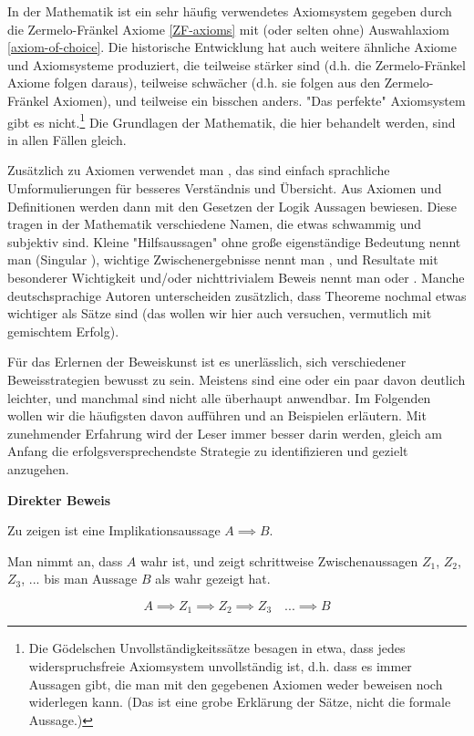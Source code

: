 In der Mathematik ist ein sehr häufig verwendetes Axiomsystem gegeben durch die Zermelo-Fränkel Axiome \ref{ZF-axioms} mit (oder selten ohne) Auswahlaxiom \ref{axiom-of-choice}. Die historische Entwicklung hat auch weitere ähnliche Axiome und Axiomsysteme produziert, die teilweise stärker sind (d.h. die Zermelo-Fränkel Axiome folgen daraus), teilweise schwächer (d.h. sie folgen aus den Zermelo-Fränkel Axiomen), und teilweise ein bisschen anders. "Das perfekte" Axiomsystem gibt es nicht.\footnote{Die Gödelschen Unvollständigkeitssätze besagen in etwa, dass jedes widerspruchsfreie Axiomsystem unvollständig ist, d.h. dass es immer Aussagen gibt, die man mit den gegebenen Axiomen weder beweisen noch widerlegen kann. (Das ist eine grobe Erklärung der Sätze, nicht die formale Aussage.)} Die Grundlagen der Mathematik, die hier behandelt werden, sind in allen Fällen gleich.

Zusätzlich zu Axiomen verwendet man , das sind einfach sprachliche Umformulierungen für besseres Verständnis und Übersicht. Aus Axiomen und Definitionen werden dann mit den Gesetzen der Logik Aussagen bewiesen. Diese tragen in der Mathematik verschiedene Namen, die etwas schwammig und subjektiv sind. Kleine "Hilfsaussagen" ohne große eigenständige Bedeutung nennt man  (Singular ), wichtige Zwischenergebnisse nennt man , und Resultate mit besonderer Wichtigkeit und/oder nichttrivialem Beweis nennt man  oder . Manche deutschsprachige Autoren unterscheiden zusätzlich, dass Theoreme nochmal etwas wichtiger als Sätze sind (das wollen wir hier auch versuchen, vermutlich mit gemischtem Erfolg).

Für das Erlernen der Beweiskunst ist es unerlässlich, sich verschiedener Beweisstrategien bewusst zu sein. Meistens sind eine oder ein paar davon deutlich leichter, und manchmal sind nicht alle überhaupt anwendbar. Im Folgenden wollen wir die häufigsten davon aufführen und an Beispielen erläutern. Mit zunehmender Erfahrung wird der Leser immer besser darin werden, gleich am Anfang die erfolgsversprechendste Strategie zu identifizieren und gezielt anzugehen.

\begin{shadedbox}
    \textbf{Direkter Beweis}

    Zu zeigen ist eine Implikationsaussage $A \implies B$.

    Man nimmt an, dass $A$ wahr ist, und zeigt schrittweise Zwischenaussagen $Z_1$, $Z_2$, $Z_3$, ... bis man Aussage $B$ als wahr gezeigt hat.

    $$A \implies Z_1 \implies Z_2 \implies Z_3 \quad ... \implies B$$
\end{shadedbox}

